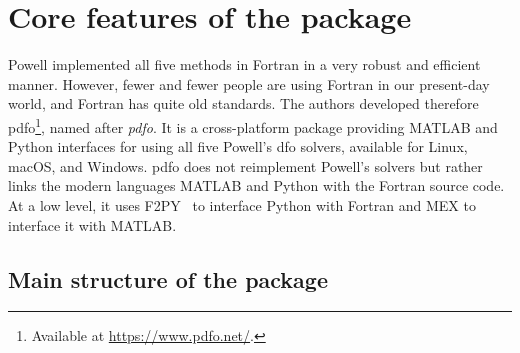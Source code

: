 \section{Core features of the  package}

Powell implemented all five methods in Fortran in a very robust and efficient manner.
However, fewer and fewer people are using Fortran in our present-day world, and Fortran has quite old standards.
The authors developed therefore \gls{pdfo}\footnote{Available at \url{https://www.pdfo.net/}.}, named after \emph{\glsdesc{pdfo}}.
It is a cross-platform package providing MATLAB and Python interfaces for using all five Powell's \gls{dfo} solvers, available for Linux, macOS, and Windows.
\Gls{pdfo} does not reimplement Powell's solvers but rather links the modern languages MATLAB and Python with the Fortran source code.
At a low level, it uses F2PY~\cite{Peterson_2009} to interface Python with Fortran and MEX to interface it with MATLAB.

\subsection{Main structure of the package}

